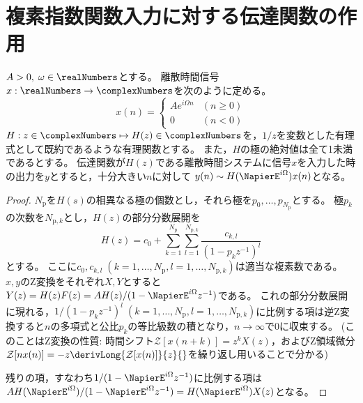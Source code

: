         \section{複素指数関数入力に対する伝達関数の作用}
            \begin{shadebox}
                $A>0,\;\omega \in \realNumbers$とする。
                離散時間信号$x: \realNumbers \to \complexNumbers$を次のように定める。
                \[
                    x(n) =
                    \begin{cases}
                        Ae^{i\Omega n} & (n\geq 0) \\
                        0 & (n<0)
                    \end{cases}
                \]
                $H: z\in\complexNumbers \mapsto H(z) \in \complexNumbers$を，$1/z$を変数とした有理式として既約であるような有理関数とする。
                また，$H$の極の絶対値は全て1未満であるとする。
                伝達関数が$H(z)$である離散時間システムに信号$x$を入力した時の出力を$y$とすると，十分大きい$n$に対して
                $y(n) \sim H(\NapierE^{i\Omega})x(n)$となる。
            \end{shadebox}
            \begin{proof}
                \quad\par
                $N_\text{p}$を$H(s)$の相異なる極の個数とし，それら極を$p_0,\dots,p_{N_\text{p}}$とする。
                極$p_k$の次数を$N_{\text{p},k}$とし，$H(z)$の部分分数展開を
                \[ H(z) = c_0 + \sum_{k=1}^{N_\mathrm{p}} \sum_{l=1}^{N_{\mathrm{p},k}} \frac{c_{k,l}}{(1-p_kz^{-1})^l} \]
                とする。
                ここに$c_0,c_{k,l}\;(k=1,\dots,N_\mathrm{p},l=1,\dots,N_{\mathrm{p},k})$は適当な複素数である。
                $x,y$のZ変換をそれぞれ$X,Y$とすると$Y(z) = H(z)F(z) = A H(z)/(1-\NapierE^{i\Omega}z^{-1})$である。
                これの部分分数展開に現れる，$1/(1-p_k z^{-1})^l\;(k=1,\dots,N_\mathrm{p},l=1,\dots,N_{\mathrm{p},k})$に比例する項は逆Z変換すると$n$の多項式と公比$p_k$の等比級数の積となり，$n\to\infty$で0に収束する。
                (このことはZ変換の性質: 時間シフト$\mathcal{Z}[x(n+k)] = z^kX(z)$，およびZ領域微分$\mathcal{Z}[nx(n)] = -z\derivLong{\mathcal{Z}[x(n)]}{z}{}$を繰り返し用いることで分かる)
                \par
                残りの項，すなわち$1/(1-\NapierE^{i\Omega}z^{-1})$に比例する項は$AH(\NapierE^{i\Omega})/(1-\NapierE^{i\Omega}z^{-1}) = H(\NapierE^{i\Omega})X(z)$となる。
            \end{proof}
